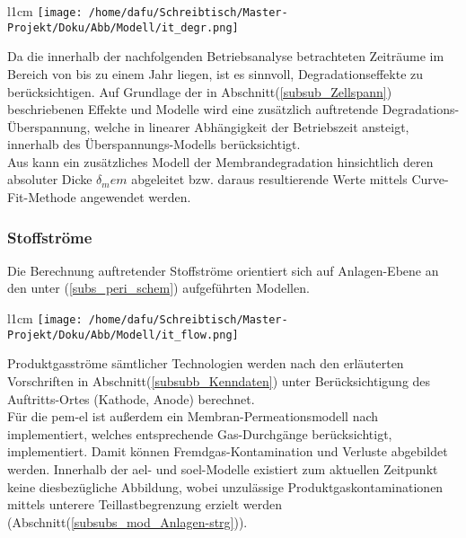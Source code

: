 \documentclass[onecolumn,10pt,titlepage]{article}
\begin{document}
\begin{wrapfigure}{l}{1cm}
	\texttt{[image: /home/dafu/Schreibtisch/Master-Projekt/Doku/Abb/Modell/it\_degr.png]}
\end{wrapfigure} Da die innerhalb der nachfolgenden Betriebsanalyse betrachteten Zeiträume im Bereich von bis zu einem Jahr liegen, ist es sinnvoll, Degradationseffekte zu berücksichtigen. Auf Grundlage der in Abschnitt(\ref{subsub_Zellspann}) beschriebenen Effekte und Modelle wird eine zusätzlich auftretende Degradations-Überspannung, welche in linearer Abhängigkeit der Betriebszeit ansteigt, innerhalb des Überspannungs-Modells berücksichtigt.\\
Aus \cite{Chandesris2015} kann ein zusätzliches Modell der Membrandegradation hinsichtlich deren absoluter Dicke $\delta_mem $ abgeleitet bzw. daraus resultierende Werte mittels Curve-Fit-Methode angewendet werden. 



\subsubsection{Stoffströme}
\label{subsubs_mod_stoffstroeme}

Die Berechnung auftretender Stoffströme orientiert sich auf Anlagen-Ebene an den unter (\ref{subs_peri_schem}) aufgeführten Modellen.
\begin{wrapfigure}{l}{1cm}
	\texttt{[image: /home/dafu/Schreibtisch/Master-Projekt/Doku/Abb/Modell/it\_flow.png]}
\end{wrapfigure} Produktgasströme sämtlicher Technologien werden nach den erläuterten Vorschriften in Abschnitt(\ref{subsubb_Kenndaten}) unter Berücksichtigung des Auftritts-Ortes (Kathode, Anode) berechnet.\\
Für die \gls{pem}-\gls{el} ist außerdem ein Membran-Permeationsmodell nach \cite{Tjarks2017} implementiert, welches entsprechende Gas-Durchgänge berücksichtigt, implementiert. Damit können Fremdgas-Kontamination und Verluste abgebildet werden. Innerhalb der \gls{ael}- und \gls{soel}-Modelle existiert zum aktuellen Zeitpunkt keine diesbezügliche Abbildung, wobei unzulässige Produktgaskontaminationen mittels unterere Teillastbegrenzung erzielt werden (Abschnitt(\ref{subsubs_mod_Anlagen-strg})). 
\end{document}
